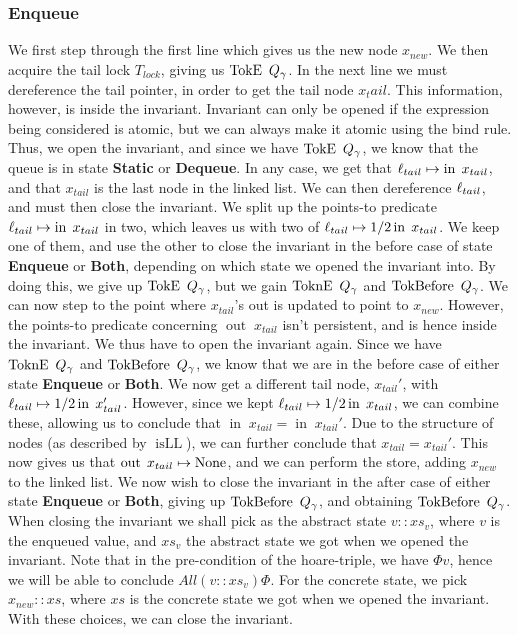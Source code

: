 \documentclass[twoside,11pt,openright]{report}
\newcommand{\isLL}{\operatorname{isLL}}
\newcommand{\nIn}[1]{\operatorname{in} \; #1}
\newcommand{\nOut}[1]{\operatorname{out} \; #1}
\newcommand{\StaticState}{\textbf{Static}}
\newcommand{\EnqueueState}{\textbf{Enqueue}}
\newcommand{\DequeueState}{\textbf{Dequeue}}
\newcommand{\BothState}{\textbf{Both}}
\newcommand{\Qgnames}{Q_\gname}
\newcommand{\TokE}[1]{\operatorname{TokE}\ #1}
\newcommand{\TokEQg}{\TokE{\Qgnames}}
\newcommand{\ToknE}[1]{\operatorname{ToknE}\ #1}
\newcommand{\ToknEQg}{\ToknE{\Qgnames}}
\newcommand{\TokBefore}[1]{\operatorname{TokBefore}\ #1}
\newcommand{\TokBeforeQg}{\TokBefore{\Qgnames}}
\newcommand{\TokAfterQg}{\TokBefore{\Qgnames}}
\begin{document}
\subsubsection{Enqueue}
We first step through the first line which gives us the new node $x_{new}$. We then acquire the tail lock $T_{lock}$, giving us $\TokEQg$. In the next line we must dereference the tail pointer, in order to get the tail node $x_tail$. This information, however, is inside the invariant. Invariant can only be opened if the expression being considered is atomic, but we can always make it atomic using the bind rule. Thus, we open the invariant, and since we have $\TokEQg$, we know that the queue is in state \StaticState{} or \DequeueState{}. In any case, we get that $\loc_{tail} \mapsto \nIn{x_{tail}}$, and that $x_{tail}$ is the last node in the linked list. We can then dereference $\ell_{tail}$, and must then close the invariant. We split up the points-to predicate $\loc_{tail} \mapsto \nIn{x_{tail}}$ in two, which leaves us with two of $\loc_{tail} \mapsto{1/2} \nIn{x_{tail}}$. We keep one of them, and use the other to close the invariant in the before case of state \EnqueueState{} or \BothState{}, depending on which state we opened the invariant into. By doing this, we give up $\TokEQg$, but we gain $\ToknEQg$ and $\TokAfterQg$. We can now step to the point where $x_{tail}$'s out is updated to point to $x_{new}$. However, the points-to predicate concerning $\nOut{x_{tail}}$ isn't persistent, and is hence inside the invariant. We thus have to open the invariant again. Since we have $\ToknEQg$ and $\TokAfterQg$, we know that we are in the before case of either state \EnqueueState{} or \BothState{}. We now get a different tail node, $x_{tail}'$, with $\loc_{tail} \mapsto{1/2} \nIn{x_{tail}'}$. However, since we kept $\loc_{tail} \mapsto{1/2} \nIn{x_{tail}}$, we can combine these, allowing us to conclude that $\nIn{x_{tail}} = \nIn{x_{tail}'}$. Due to the structure of nodes (as described by $\isLL$), we can further conclude that $x_{tail} = x_{tail}'$. This now gives us that $\nOut{x_{tail}} \mapsto \None$, and we can perform the store, adding $x_{new}$ to the linked list. We now wish to close the invariant in the after case of either state \EnqueueState{} or \BothState{}, giving up $\TokAfterQg$, and obtaining $\TokBeforeQg$. When closing the invariant we shall pick as the abstract state $v :: xs_v$, where $v$ is the enqueued value, and $xs_v$ the abstract state we got when we opened the invariant. Note that in the pre-condition of the hoare-triple, we have $\Phi v$, hence we will be able to conclude $All (v :: xs_v) \Phi$. For the concrete state, we pick $x_{new} :: xs$, where $xs$ is the concrete state we got when we opened the invariant. With these choices, we can close the invariant.\\
\end{document}
